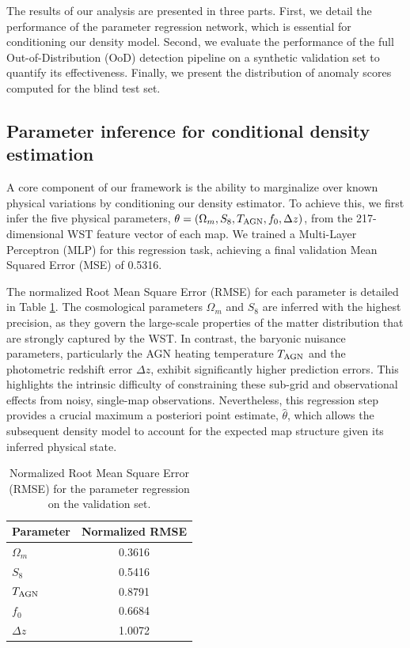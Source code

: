 \documentclass[]{article}
\begin{document}
The results of our analysis are presented in three parts. First, we detail the performance of the parameter regression network, which is essential for conditioning our density model. Second, we evaluate the performance of the full Out-of-Distribution (OoD) detection pipeline on a synthetic validation set to quantify its effectiveness. Finally, we present the distribution of anomaly scores computed for the blind test set.

\subsection{Parameter inference for conditional density estimation}
A core component of our framework is the ability to marginalize over known physical variations by conditioning our density estimator. To achieve this, we first infer the five physical parameters, $\theta = (\Omega_m, S_8, T_{\rm AGN}, f_0, \Delta z)$, from the 217-dimensional WST feature vector of each map. We trained a Multi-Layer Perceptron (MLP) for this regression task, achieving a final validation Mean Squared Error (MSE) of 0.5316. 

The normalized Root Mean Square Error (RMSE) for each parameter is detailed in Table \ref{tab:rmse}. The cosmological parameters $\Omega_m$ and $S_8$ are inferred with the highest precision, as they govern the large-scale properties of the matter distribution that are strongly captured by the WST. In contrast, the baryonic nuisance parameters, particularly the AGN heating temperature $T_{\rm AGN}$ and the photometric redshift error $\Delta z$, exhibit significantly higher prediction errors. This highlights the intrinsic difficulty of constraining these sub-grid and observational effects from noisy, single-map observations. Nevertheless, this regression step provides a crucial maximum a posteriori point estimate, $\hat{\theta}$, which allows the subsequent density model to account for the expected map structure given its inferred physical state.

\begin{table}[h!]
\centering
\caption{Normalized Root Mean Square Error (RMSE) for the parameter regression on the validation set.}
\label{tab:rmse}
\begin{tabular}{lc}
\hline
\hline
Parameter & Normalized RMSE \\
\hline
$\Omega_m$ & 0.3616 \\
$S_8$ & 0.5416 \\
$T_{\rm AGN}$ & 0.8791 \\
$f_0$ & 0.6684 \\
$\Delta z$ & 1.0072 \\
\hline
\end{tabular}
\end{table}
\end{document}
